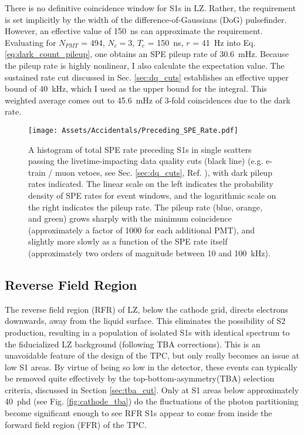 There is no definitive coincidence window for S1s in LZ.
Rather, the requirement is set implicitly by the width of the difference-of-Gaussians (DoG) pulsefinder.
However, an effective value of 150~ns can approximate the requirement.
Evaluating for $N_{PMT}$ = 494, $N_c=3$, $T_c$ = 150~ns, $r$ = 41~Hz into Eq. \ref{eq:dark_count_pileup}, one obtains an SPE pileup rate of 30.6~mHz.
Because the pileup rate is highly nonlinear, I also calculate the expectation value.
The sustained rate cut discussed in Sec. \ref{sec:dq_cuts} establishes an effective upper bound of 40~kHz, which I used as the upper bound for the integral.
This weighted average comes out to 45.6~mHz of 3-fold coincidences due to the dark rate.

\begin{figure}
    \centering
    \texttt{[image: Assets/Accidentals/Preceding\_SPE\_Rate.pdf]}
    \caption[A histogram of total SPE rate preceding S1s in single scatters passing the livetime-impacting data quality cuts]%
    {A histogram of total SPE rate preceding S1s in single scatters passing the livetime-impacting data quality cuts (black line) (e.g. e-train / muon vetoes, see Sec. \ref{sec:dq_cuts}, Ref. \cite{aalbers_background_2022}), with dark pileup rates indicated.
    The linear scale on the left indicates the probability density of SPE rates for event windows, and the logarithmic scale on the right indicates the pileup rate.
    The pileup rate (blue, orange, and green) grows sharply with the minimum coincidence (approximately a factor of 1000 for each additional PMT), and slightly more slowly as a function of the SPE rate itself (approximately two orders of magnitude between 10 and 100~kHz). }
    \label{fig:spe_rate}
\end{figure}

\subsection {Reverse Field Region}
The reverse field region (RFR) of LZ, below the cathode grid, directs electrons downwards, away from the liquid surface.
This eliminates the possibility of S2 production, resulting in a population of isolated S1s with identical spectrum to the fiducialized LZ background (following TBA corrections).
This is an unavoidable feature of the design of the TPC, but only really becomes an issue at low S1 areas.
By virtue of being so low in the detector, these events can typically be removed quite effectively by the top-bottom-asymmetry(TBA) selection criteria, discussed in Section \ref{sec:tba_cut}.
Only at S1 areas below approximately 40~phd (see Fig. \ref{fig:cathode_tba}) do the fluctuations of the photon partitioning become significant enough to see RFR S1s appear to come from inside the forward field region (FFR) of the TPC.

